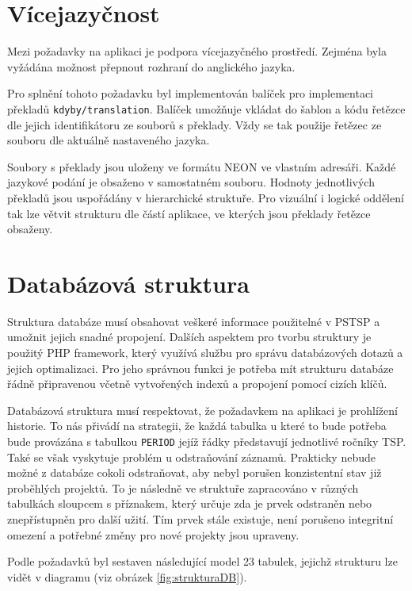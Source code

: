 \documentclass[czech,BP]{thesiskiv}
\begin{document}
		\section{Vícejazyčnost}
		\par Mezi požadavky na aplikaci je podpora vícejazyčného prostředí. Zejména byla vyžádána možnost přepnout rozhraní do anglického jazyka.
		\par Pro splnění tohoto požadavku byl implementován balíček pro implementaci překladů \texttt{kdyby/translation}. Balíček umožňuje vkládat do šablon a kódu řetězce dle jejich identifikátoru ze souborů s překlady. Vždy se tak použije řetězec ze souboru dle aktuálně nastaveného jazyka.
		\par Soubory s překlady jsou uloženy ve formátu NEON ve vlastním adresáři. Každé jazykové podání je obsaženo v samostatném souboru. Hodnoty jednotlivých překladů jsou uspořádány v hierarchické struktuře. Pro vizuální i logické oddělení tak lze větvit strukturu dle částí aplikace, ve kterých jsou překlady řetězce obsaženy.
	
	\section{Databázová struktura}
		\par Struktura databáze musí obsahovat veškeré informace použitelné v PSTSP a umožnit jejich snadné propojení. Dalších aspektem pro tvorbu struktury je použitý PHP framework, který využívá službu pro správu databázových dotazů a jejich optimalizaci. Pro jeho správnou funkci je potřeba mít strukturu databáze řádně připravenou včetně vytvořených indexů a propojení pomocí cizích klíčů.
		\par Databázová struktura musí respektovat, že požadavkem na aplikaci je prohlížení historie. To nás přivádí na strategii, že každá tabulka u které to bude potřeba bude provázána s tabulkou \texttt{PERIOD} jejíž řádky představují jednotlivé ročníky TSP. Také se však vyskytuje problém u odstraňování záznamů. Prakticky nebude možné z databáze cokoli odstraňovat, aby nebyl porušen konzistentní stav již proběhlých projektů. To je následně ve struktuře zapracováno v různých tabulkách sloupcem s příznakem, který určuje zda je prvek odstraněn nebo znepřístupněn pro další užití. Tím prvek stále existuje, není porušeno integritní omezení a potřebné změny pro nové projekty jsou upraveny.
		\par Podle požadavků byl sestaven následující model 23 tabulek, jejichž strukturu lze vidět v diagramu (viz obrázek \ref{fig:strukturaDB}).
		
\end{document}
